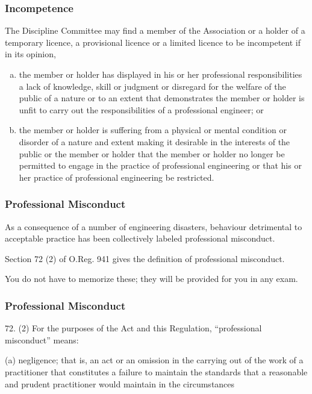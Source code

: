\begin{frame}
\frametitle{Incompetence}

The Discipline Committee may find a member of the Association or a holder of a temporary licence, a provisional licence or a limited licence to be incompetent if in its opinion,

\begin{enumerate}[(a)]
\item the member or holder has displayed in his or her professional responsibilities a lack of knowledge, skill or judgment or disregard for the welfare of the public of a nature or to an extent that demonstrates the member or holder is unfit to carry out the responsibilities of a professional engineer; or
\item the member or holder is suffering from a physical or mental condition or disorder of a nature and extent making it desirable in the interests of the public or the member or holder that the member or holder no longer be permitted to engage in the practice of professional engineering or that his or her practice of professional engineering be restricted. 
\end{enumerate}

\end{frame}




\begin{frame}
\frametitle{Professional Misconduct}

As a consequence of a number of engineering disasters, behaviour detrimental to acceptable practice has been collectively labeled \alert{professional misconduct}.

Section 72 (2) of O.Reg. 941 gives the definition of professional misconduct.

You do not have to memorize these; they will be provided for you in any exam.
\end{frame}



\begin{frame}
\frametitle{Professional Misconduct}

72. (2) For the purposes of the Act and this Regulation, ``professional misconduct'' means:


(a) negligence; that is, an act or an omission in the carrying out of  the work of a practitioner that constitutes a failure to maintain  the standards that a reasonable and prudent practitioner would  maintain in the circumstances


\end{frame}


